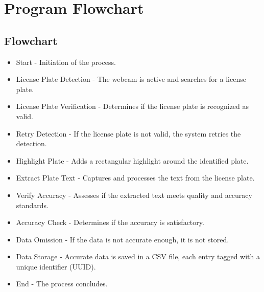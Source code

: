 %
%

\chapter{Program Flowchart}

\section{Flowchart}

\begin{itemize}
	\item Start - Initiation of the process.
	\item License Plate Detection - The webcam is active and searches for a license plate.
	\item License Plate Verification - Determines if the license plate is recognized as valid.
	\item Retry Detection - If the license plate is not valid, the system retries the detection.
	\item Highlight Plate - Adds a rectangular highlight around the identified plate.
	\item Extract Plate Text - Captures and processes the text from the license plate.
	\item Verify Accuracy - Assesses if the extracted text meets quality and accuracy standards.
	\item Accuracy Check - Determines if the accuracy is satisfactory.
	\item Data Omission - If the data is not accurate enough, it is not stored.
	\item Data Storage - Accurate data is saved in a CSV file, each entry tagged with a unique identifier (UUID).
	\item End - The process concludes.
\end{itemize}

